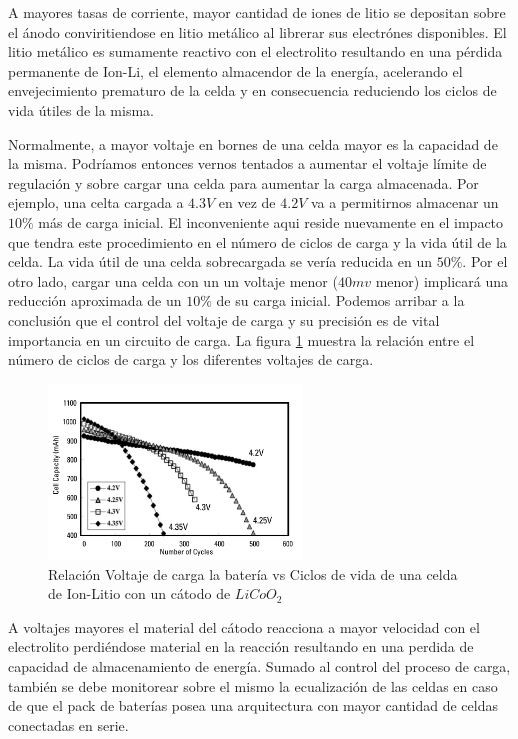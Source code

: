 \documentclass[10pt,a4paper]{article}
\begin{document}
A mayores tasas de corriente, mayor cantidad de iones de litio se depositan
sobre el ánodo conviritiendose en litio metálico al librerar sus electrónes
disponibles.  El litio metálico es sumamente reactivo con el electrolito
resultando en una pérdida permanente de \acrshort{Ion-Li}, el elemento
almacendor de la energía, acelerando el envejecimiento prematuro de la celda y
en consecuencia reduciendo los ciclos de vida útiles de la misma. 

Normalmente, a mayor voltaje en bornes de una celda mayor es la capacidad de la
misma. Podríamos entonces vernos tentados a aumentar el voltaje límite de
regulación y sobre cargar una celda para aumentar la carga almacenada. Por
ejemplo, una celta cargada a $4.3V$ en vez de $4.2V$ va a permitirnos almacenar
un $10\%$ más de carga inicial. El inconveniente aqui reside nuevamente en el
impacto que tendra este procedimiento en el número de ciclos de carga y la vida
útil de la celda. La vida útil de una celda sobrecargada se vería reducida en
un $50\%$.  Por el otro lado, cargar una celda con un un voltaje menor ($40mv$
menor) implicará una reducción aproximada de un $10\%$ de su carga inicial.
Podemos arribar a la conclusión que el control del voltaje de carga y su
precisión es de vital importancia en un circuito de carga. La figura
\ref{fig:C_vs_Cycle_V} muestra la relación entre el número de ciclos de carga y
los diferentes voltajes de carga. 

\begin{figure}[h!] \centering
    \includegraphics[width=0.6\textwidth]{bat_char/C_vs_Cycle_V.png}
    \caption{Relación Voltaje de carga la batería vs Ciclos de vida de una celda de
Ion-Litio con un cátodo de $LiCoO_2$} \label{fig:C_vs_Cycle_V} \end{figure}
\FloatBarrier

A voltajes mayores el material del cátodo reacciona a mayor velocidad con el
electrolito perdiéndose material en la reacción resultando en una perdida de
capacidad de almacenamiento de energía. Sumado al control del proceso de carga,
tambi\'en se debe monitorear sobre el mismo la ecualizaci\'on de las celdas en
caso de que el pack de bater\'ias posea una arquitectura con mayor cantidad de
celdas conectadas en serie.
\end{document}
